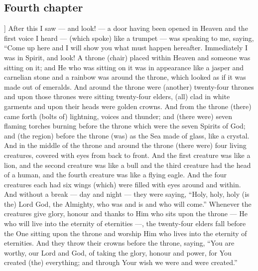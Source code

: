 \begin{pages}
\begin{Rightside}
        			\chapter*{Fourth chapter}
				]
		After this I saw — and look! — a door having been opened in Heaven and the first voice I heard — (which spoke) like a trumpet — was speaking to me, saying, “Come up here and I will show you what must happen hereafter. Immediately I was in Spirit, and look! A throne (chair) placed within Heaven and someone was sitting on it; and He who was sitting on it was in appearance like a jasper and carnelian stone and a rainbow was around the throne, which looked as if it was made out of emeralds. And around the throne were (another) twenty-four thrones and upon those thrones were sitting twenty-four elders, (all) clad in white garments and upon their heads were golden crowns. And from the throne (there) came forth (bolts of) lightning, voices and thunder; and (there were) seven flaming torches burning before the throne which were the seven Spirits of God; and (the region) before the throne (was) as the Sea made of glass, like a crystal.
		\pend
		\pstart
		And in the middle of the throne and around the throne (there were) four living creatures, covered with eyes from back to front. And the first creature was like a lion, and the second creature was like a bull and the third creature had the head of a human, and the fourth creature was like a flying eagle. And the four creatures each had six wings (which) were filled with eyes around and within. And without a break — day and night — they were saying, “Holy, holy, holy (is the) Lord God, the Almighty, who was and is and who will come.”
		\pend
		\pstart
		Whenever the creatures give glory, honour and thanks to Him who sits upon the throne — He who will live into the eternity of eternities —, the twenty-four elders fall before the One sitting upon the throne and worship Him who lives into the eternity of eternities. And they throw their crowns before the throne, saying, “You are worthy, our Lord and God, of taking the glory, honour and power, for You created (the) everything; and through Your wish we were and were created.”
		\pend
        \endnumbering
    \end{Rightside}

\end{pages} 
\Pages
